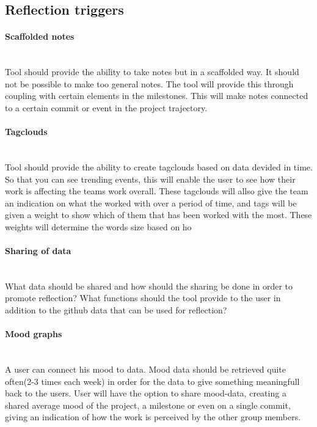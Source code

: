 \subsection{Reflection triggers}
\paragraph{Scaffolded notes}\mbox{}\\
Tool should provide the ability to take notes but in a scaffolded way. It should not be possible to make too general notes. The tool will provide this through coupling with certain elements in the milestones. This will make notes connected to a certain commit or event in the project trajectory. 

\paragraph{Tagclouds}\mbox{}\\
Tool should provide the ability to create tagclouds based on data devided in time. So that you can see trending events, this will enable the user to see how their work is affecting the teams work overall. These tagclouds will allso give the team an indication on what the worked with over a period of time, and tags will be given a weight to show which of them that has been worked with the most. These weights will determine the words size based on ho

\paragraph{Sharing of data}\mbox{}\\
What data should be shared and how should the sharing be done in order to promote reflection? What functions should the tool provide to the user in addition to the github data that can be used for reflection?

\paragraph{Mood graphs}\mbox{}\\
A user can connect his mood to data. Mood data should be retrieved quite often(2-3 times each week) in order for the data to give something meaningfull back to the users.
User will have the option to share mood-data, creating a shared average mood of the project, a milestone or even on a single commit, giving an indication of how the work is perceived by the other group members. 
